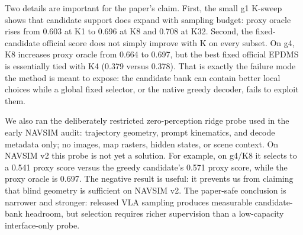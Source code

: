 \documentclass{article}
\begin{document}
\begin{table}[t]
\centering
\caption{Mapped NAVSIM v2 OneVL smoke audit. K8 consistently increases the per-token
proxy oracle over K4, but official fixed-candidate gains are not monotone at larger
scale. This supports a bounded candidate-headroom claim and exposes selector learning as
the unresolved problem.}
\label{tab:navsim_v2_scaling}
\scriptsize
{}
\end{table}

Two details are important for the paper's claim. First, the small g1 K-sweep shows that
candidate support does expand with sampling budget: proxy oracle rises from 0.603 at
K1 to 0.696 at K8 and 0.708 at K32. Second, the fixed-candidate official score does not
simply improve with K on every subset. On g4, K8 increases proxy oracle from 0.664 to
0.697, but the best fixed official EPDMS is essentially tied with K4 (0.379 versus
0.378). That is exactly the failure mode the method is meant to expose: the candidate
bank can contain better local choices while a global fixed selector, or the native greedy
decoder, fails to exploit them.

We also ran the deliberately restricted zero-perception ridge probe used in the early
NAVSIM audit: trajectory geometry, prompt kinematics, and decode metadata only; no images,
map rasters, hidden states, or scene context. On NAVSIM v2 this probe is not yet a
solution. For example, on g4/K8 it selects to a 0.541 proxy score versus the greedy
candidate's 0.571 proxy score, while the proxy oracle is 0.697. The negative result is
useful: it prevents us from claiming that blind geometry is sufficient on NAVSIM v2. The
paper-safe conclusion is narrower and stronger: released VLA sampling produces measurable
candidate-bank headroom, but selection requires richer supervision than a low-capacity
interface-only probe.
\end{document}
